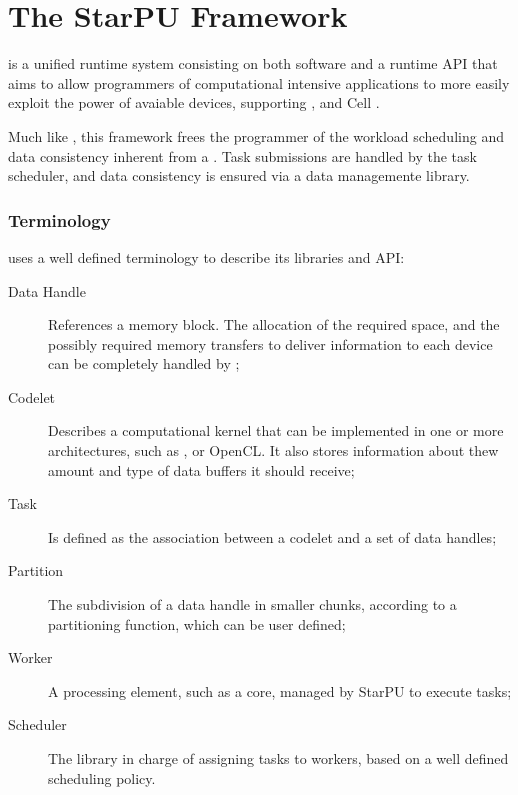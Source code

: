 \documentclass[main.tex]{subfiles}
\begin{document}
\chapter{The StarPU Framework} \label{chapter:starpu}



\starpu \cite{augonnet2011starpu} is a unified runtime system consisting on both software and a runtime API that aims to allow programmers of computational intensive applications to more easily exploit the power of avaiable devices, supporting \cpus, \gpus and Cell .

Much like \gama, this framework frees the programmer of the workload scheduling and data consistency inherent from a \hetplat. Task submissions are handled by the \starpu task scheduler, and data consistency is ensured via a data managemente library.

\subsection{Terminology}

\starpu uses a well defined terminology to describe its libraries and API:

\begin{description}
  \item[Data Handle] References a memory block. The allocation of the required space, and the possibly required memory transfers to deliver information to each device can be completely handled by \starpu;

  \item[Codelet] Describes a computational kernel that can be implemented in one or more architectures, such as \cpus, \cuda or \acs{OpenCL}. It also stores information about thew amount and type of data buffers it should receive;

  \item[Task] Is defined as the association between a codelet and a set of data handles;

  \item[Partition] The subdivision of a data handle in smaller chunks, according to a partitioning function, which can be user defined;

  \item[Worker] A processing element, such as a \cpu core, managed by StarPU to execute tasks;

  \item[Scheduler] The library in charge of assigning tasks to workers, based on a well defined scheduling policy.

\end{description}
\end{document}
